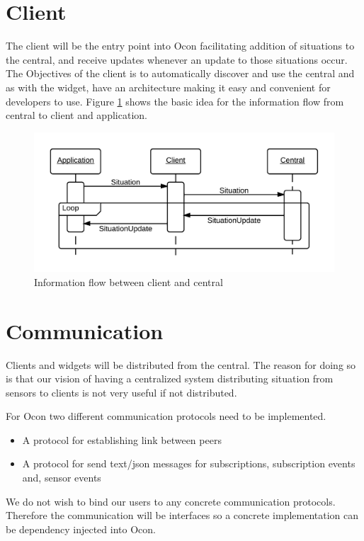 \documentclass[../report.tex]{subfiles}
\begin{document}
\section{Client}

The client will be the entry point into Ocon facilitating addition of situations to the central, and receive updates whenever an update to those situations occur. The Objectives of the client is to automatically discover and use the central and as with the widget, have an architecture making it easy and convenient for developers to use. Figure \ref{seqclient} shows the basic idea for the information flow from central to client and application.


\begin{figure}[h]
\centering
\includegraphics[scale=0.2]{clientsequencediagram.png}
\caption{Information flow between client and central}
\label{seqclient}
\end{figure}


\section{Communication}

Clients and widgets will be distributed from the central. The reason for doing so is that our vision of having a centralized system distributing situation from sensors to clients is not very useful if not distributed.

For Ocon two different communication protocols need to be implemented.\\

\begin{itemize}
    \item A protocol for establishing link between peers
    \item A protocol for send text/json messages for subscriptions, subscription events and, sensor events \\
\end{itemize}

We do not wish to bind our users to any concrete communication protocols. Therefore the communication will be interfaces so a concrete implementation can be dependency injected into Ocon.
\end{document}
